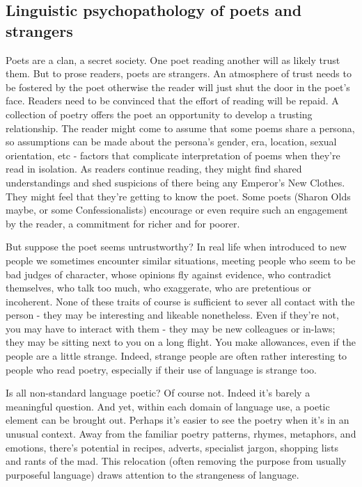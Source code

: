 \documentclass[11pt]{article}
\begin{document}
\newpage
\subsection{Linguistic psychopathology of poets and strangers}

Poets are a clan, a secret society. One poet reading another will as likely trust them. But to prose readers, poets are strangers. An atmosphere of trust needs to be fostered by the poet otherwise the reader will just shut the door in the poet's face. Readers need to be convinced that the effort of reading will be repaid. A collection of poetry offers the poet an opportunity to develop a trusting relationship. The reader might come to assume that some poems share a persona, so assumptions can be made about the persona's gender, era, location, sexual orientation, etc - factors that complicate interpretation of poems when they're read in isolation. As readers continue reading, they might find shared understandings and shed suspicions of there being any Emperor's New Clothes. They might feel that they're getting to know the poet. Some poets (Sharon Olds maybe, or some Confessionalists) encourage or even require such an engagement by the reader, a commitment for richer and for poorer. 


But suppose the poet seems untrustworthy? In real life when introduced to new people we sometimes encounter similar situations, meeting people who seem to be bad judges of character, whose opinions fly against evidence, who contradict themselves, who talk too much, who exaggerate, who are pretentious or incoherent. None of these traits of course is sufficient to sever all contact with the person - they may be interesting and likeable nonetheless. Even if they're not, you may have to interact with them - they may be new colleagues or in-laws; they may be sitting next to you on a long flight. You make allowances, even if the people are a little strange. Indeed, strange people are often rather interesting to people who read poetry, especially if their use of language is strange too.



Is all non-standard language poetic? Of course not. Indeed it's barely a meaningful question. And yet, within each domain of language use, a poetic element can be brought out. Perhaps it's easier to see the poetry when it's in an unusual context. Away from the familiar poetry patterns, rhymes, metaphors, and emotions, there's potential in recipes, adverts, specialist jargon, shopping lists and rants of the mad. This relocation (often removing the purpose from usually purposeful language) draws attention to the strangeness of language.
\end{document}
